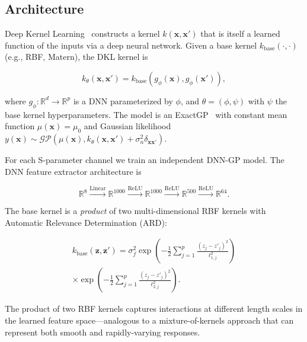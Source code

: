\documentclass[conference]{IEEEtran}
\begin{document}
\subsection{Architecture}

Deep Kernel Learning~\cite{wilson2016deep} constructs a kernel $k(\mathbf{x}, \mathbf{x}')$ that is itself a learned function of the inputs via a deep neural network. Given a base kernel $k_{\text{base}}(\cdot, \cdot)$ (e.g., RBF, Matern), the DKL kernel is

\begin{equation}\label{eq:dkl_kernel}
k_\theta(\mathbf{x}, \mathbf{x}') = k_{\text{base}}(g_\phi(\mathbf{x}), g_\phi(\mathbf{x}')),
\end{equation}

where $g_\phi: \mathbb{R}^d \to \mathbb{R}^p$ is a DNN parameterized by $\phi$, and $\theta = (\phi, \psi)$ with $\psi$ the base kernel hyperparameters. The model is an ExactGP~\cite{rasmussen2006gaussian} with constant mean function $\mu(\mathbf{x}) = \mu_0$ and Gaussian likelihood $y(\mathbf{x}) \sim \mathcal{GP}(\mu(\mathbf{x}), k_\theta(\mathbf{x}, \mathbf{x}') + \sigma_n^2 \delta_{\mathbf{x}\mathbf{x}'})$.

For each S-parameter channel we train an independent DNN-GP model. The DNN feature extractor architecture is

\begin{equation}
\mathbb{R}^{8} \xrightarrow{\text{Linear}} \mathbb{R}^{1000} \xrightarrow{\text{ReLU}} \mathbb{R}^{1000} \xrightarrow{\text{ReLU}} \mathbb{R}^{500} \xrightarrow{\text{ReLU}} \mathbb{R}^{64}.
\end{equation}

The base kernel is a \emph{product} of two multi-dimensional RBF kernels with Automatic Relevance Determination (ARD):

\begin{multline}\label{eq:product_kernel}
k_{\text{base}}(\mathbf{z}, \mathbf{z}') = \sigma_f^2
    \exp\left( -\frac{1}{2} \sum_{j=1}^{p} \frac{(z_j - z'_j)^2}{\ell_{1,j}^2} \right)\\
    \times \exp\left( -\frac{1}{2} \sum_{j=1}^{p} \frac{(z_j - z'_j)^2}{\ell_{2,j}^2} \right).
\end{multline}

The product of two RBF kernels captures interactions at different length scales in the learned feature space---analogous to a mixture-of-kernels approach that can represent both smooth and rapidly-varying responses.
\end{document}

